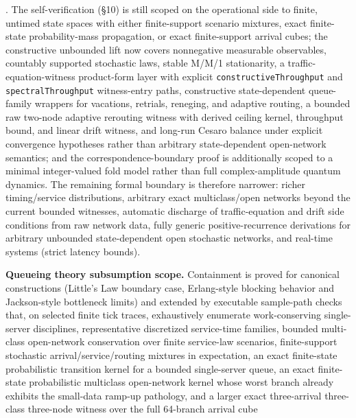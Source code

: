 \documentclass[
]{article}
\begin{document}
. The self-verification (§10) is still scoped on the operational side to
finite, untimed state spaces with either finite-support scenario
mixtures, exact finite-state probability-mass propagation, or exact
finite-support arrival cubes; the constructive unbounded lift now covers
nonnegative measurable observables, countably supported stochastic laws,
stable M/M/1 stationarity, a traffic-equation-witness product-form layer
with explicit \texttt{constructiveThroughput} and
\texttt{spectralThroughput} witness-entry paths, constructive
state-dependent queue-family wrappers for vacations, retrials, reneging,
and adaptive routing, a bounded raw two-node adaptive rerouting witness
with derived ceiling kernel, throughput bound, and linear drift witness,
and long-run Cesaro balance under explicit convergence hypotheses rather
than arbitrary state-dependent open-network semantics; and the
correspondence-boundary proof is additionally scoped to a minimal
integer-valued fold model rather than full complex-amplitude quantum
dynamics. The remaining formal boundary is therefore narrower: richer
timing/service distributions, arbitrary exact multiclass/open networks
beyond the current bounded witnesses, automatic discharge of
traffic-equation and drift side conditions from raw network data, fully
generic positive-recurrence derivations for arbitrary unbounded
state-dependent open stochastic networks, and real-time systems (strict
latency bounds).

\textbf{Queueing theory subsumption scope.} Containment is proved for
canonical constructions (Little's Law boundary case, Erlang-style
blocking behavior and Jackson-style bottleneck limits) and extended by
executable sample-path checks that, on selected finite tick traces,
exhaustively enumerate work-conserving single-server disciplines,
representative discretized service-time families, bounded multi-class
open-network conservation over finite service-law scenarios,
finite-support stochastic arrival/service/routing mixtures in
expectation, an exact finite-state probabilistic transition kernel for a
bounded single-server queue, an exact finite-state probabilistic
multiclass open-network kernel whose worst branch already exhibits the
small-data ramp-up pathology, and a larger exact three-arrival
three-class three-node witness over the full 64-branch arrival cube
\end{document}
